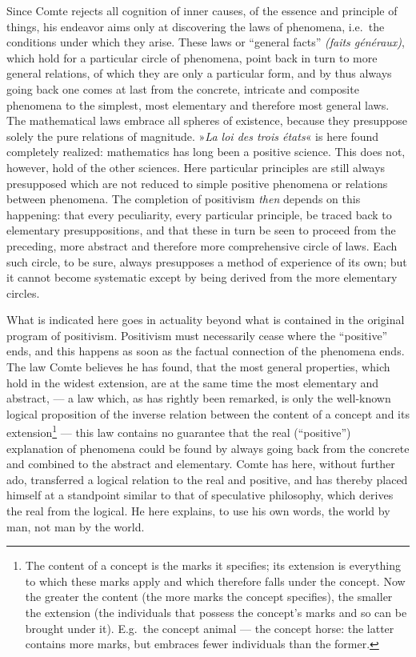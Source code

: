 \documentclass[12pt,a4paper,openany]{book}
\newcommand{\opage}[1]{\marginnote{\footnotesize\textit{[#1]}}}
\begin{document}
Since Comte rejects all cognition of inner causes,
of the essence and principle of things, his endeavor aims only
at discovering the laws of phenomena, i.e.\ the conditions
under which they arise. These laws or ``general
facts'' \textit{(faits généraux)}, which hold for a particular
circle of phenomena, point back in turn to more
general relations, of which they are only a particular form,
and by thus always going back one comes at last
from the concrete, intricate and composite phenomena to the
simplest, most elementary and therefore most general laws.
The mathematical laws embrace all spheres of existence,
because they presuppose solely the pure relations of magnitude. »\textit{La loi
des trois états}« is here found completely realized: mathematics
has long been a positive science. This does not, however,
hold of the other sciences. Here particular principles are
still always presupposed which are not reduced
to simple positive phenomena or relations between phenomena.
The completion of positivism \emph{then} depends on this
happening: that every peculiarity, every particular principle,
be traced back to elementary presuppositions, and that these in turn
be seen to proceed from the preceding, more abstract and therefore
more comprehensive circle of laws. Each such circle, to be sure,
always presupposes a method of experience of its own; but it
cannot become systematic except by being derived from the more
elementary circles.

What is indicated here goes in actuality beyond
what is contained in the original program of positivism.
Positivism must necessarily cease where the ``positive''
ends, and this happens as soon as the factual connection of
the phenomena ends. The law Comte believes he has
found, that the most general properties, which hold in the
widest extension, are at the same time the most elementary and abstract, ---
a law which, as has rightly been remarked, is only the
well-known logical proposition of the inverse relation between
\opage{203}the content of a concept and its extension\footnote{The content of a concept is the marks it specifies; its extension is everything to which these marks apply and which therefore falls under the concept. Now the greater the content (the more marks the concept specifies), the smaller the extension (the individuals that possess the concept's marks and so can be brought under it). E.g.\ the concept animal --- the concept horse: the latter contains more marks, but embraces fewer individuals than the former.} --- this law contains
no guarantee that the real (``positive'') explanation
of phenomena could be found by always going back
from the concrete and combined to the abstract and
elementary. Comte has here, without further ado, transferred a logical
relation to the real and positive, and has thereby placed himself
at a standpoint similar to that of speculative philosophy, which
derives the real from the logical. He here explains, to
use his own words, the world by man, not man
by the world.
\end{document}
